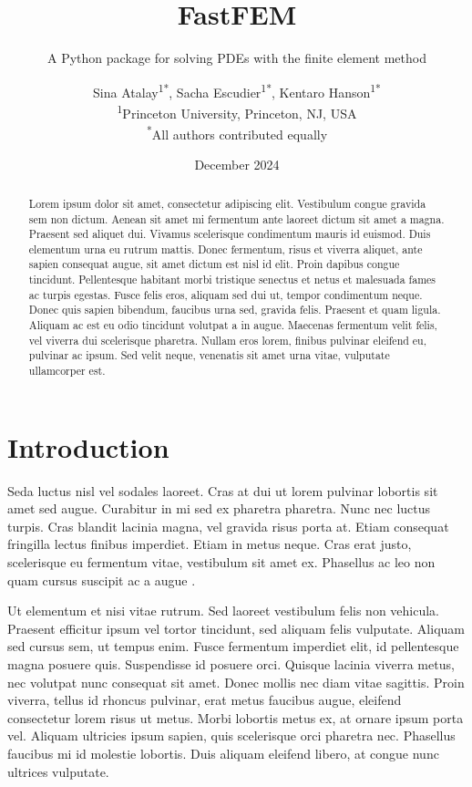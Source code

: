 \documentclass[headings=standardclasses, abstract=true]{scrartcl}
\title{FastFEM}
\subtitle{A Python package for solving PDEs with the finite element method}
\author{
    Sina Atalay\textsuperscript{1*}, Sacha Escudier\textsuperscript{1*}, Kentaro Hanson\textsuperscript{1*} \\
    {\footnotesize \textsuperscript{1}Princeton University, Princeton, NJ, USA}\\
    {\footnotesize \textsuperscript{*}All authors contributed equally}
}
\date{
    \normalsize December 2024
}
\begin{document}
\maketitle

\begin{abstract}
\noindent Lorem ipsum dolor sit amet, consectetur adipiscing elit. Vestibulum congue gravida sem non dictum. Aenean sit amet mi fermentum ante laoreet dictum sit amet a magna. Praesent sed aliquet dui. Vivamus scelerisque condimentum mauris id euismod. Duis elementum urna eu rutrum mattis. Donec fermentum, risus et viverra aliquet, ante sapien consequat augue, sit amet dictum est nisl id elit. Proin dapibus congue tincidunt. Pellentesque habitant morbi tristique senectus et netus et malesuada fames ac turpis egestas. Fusce felis eros, aliquam sed dui ut, tempor condimentum neque. Donec quis sapien bibendum, faucibus urna sed, gravida felis. Praesent et quam ligula. Aliquam ac est eu odio tincidunt volutpat a in augue. Maecenas fermentum velit felis, vel viverra dui scelerisque pharetra. Nullam eros lorem, finibus pulvinar eleifend eu, pulvinar ac ipsum. Sed velit neque, venenatis sit amet urna vitae, vulputate ullamcorper est.
\end{abstract}

\section{Introduction}

Seda luctus nisl vel sodales laoreet. Cras at dui ut lorem pulvinar lobortis sit amet sed augue. Curabitur in mi sed ex pharetra pharetra. Nunc nec luctus turpis. Cras blandit lacinia magna, vel gravida risus porta at. Etiam consequat fringilla lectus finibus imperdiet. Etiam in metus neque. Cras erat justo, scelerisque eu fermentum vitae, vestibulum sit amet ex. Phasellus ac leo non quam cursus suscipit ac a augue \cite{Serway2014}.

Ut elementum et nisi vitae rutrum. Sed laoreet vestibulum felis non vehicula. Praesent efficitur ipsum vel tortor tincidunt, sed aliquam felis vulputate. Aliquam sed cursus sem, ut tempus enim. Fusce fermentum imperdiet elit, id pellentesque magna posuere quis. Suspendisse id posuere orci. Quisque lacinia viverra metus, nec volutpat nunc consequat sit amet. Donec mollis nec diam vitae sagittis. Proin viverra, tellus id rhoncus pulvinar, erat metus faucibus augue, eleifend consectetur lorem risus ut metus. Morbi lobortis metus ex, at ornare ipsum porta vel. Aliquam ultricies ipsum sapien, quis scelerisque orci pharetra nec. Phasellus faucibus mi id molestie lobortis. Duis aliquam eleifend libero, at congue nunc ultrices vulputate.
\end{document}
